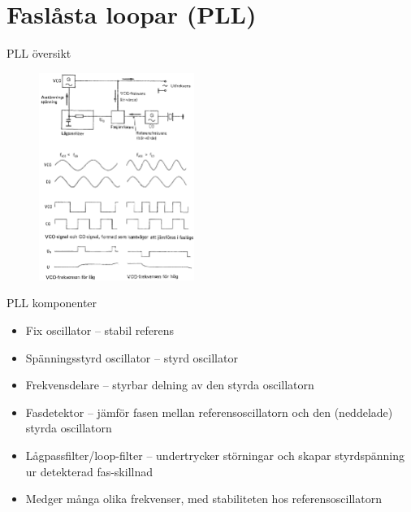 \documentclass{beamer}
\begin{document}
\section{Faslåsta loopar (PLL)}

\begin{frame}{PLL översikt}

\begin{figure}[h]
\includegraphics[width=0.45\textwidth]{images/cropped_pdfs/bild_2_3-80b.pdf}
\end{figure}

\end{frame}

\begin{frame}{PLL komponenter}
  \begin{itemize}
    \item Fix oscillator -- stabil referens
    \item Spänningsstyrd oscillator -- styrd oscillator
    \item Frekvensdelare -- styrbar delning av den styrda oscillatorn
    \item Fasdetektor -- jämför fasen mellan referensoscillatorn och den (neddelade) styrda oscillatorn
    \item Lågpassfilter/loop-filter -- undertrycker störningar och skapar styrdspänning ur detekterad fas-skillnad
    \item Medger många olika frekvenser, med stabiliteten hos referensoscillatorn
  \end{itemize}
\end{frame}
\end{document}
